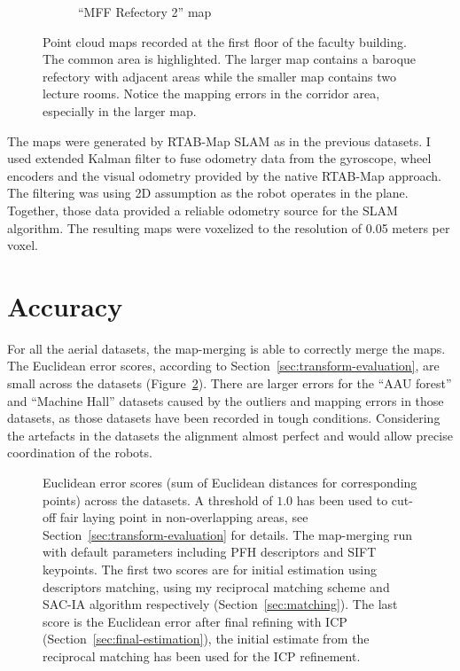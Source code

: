 \begin{figure}
\begin{subfigure}[b]{\textwidth}
        \caption{``MFF Refectory 2'' map}
    \end{subfigure}
    \caption[MFF Refectory maps]{Point cloud maps recorded at the first floor of the faculty building. The common area is highlighted. The larger map contains a baroque refectory with adjacent areas while the smaller map contains two lecture rooms. Notice the mapping errors in the corridor area, especially in the larger map.}
    \label{fig:mff_refectory}
\end{figure}


The maps were generated by RTAB-Map \gls{SLAM} as in the previous datasets. I used extended Kalman filter to fuse odometry data from the gyroscope, wheel encoders and the visual odometry provided by the native RTAB-Map approach. The filtering was using \gls{2D} assumption as the robot operates in the plane. Together, those data provided a reliable odometry source for the \gls{SLAM} algorithm. The resulting maps were voxelized to the resolution of 0.05 meters per voxel.

\section{Accuracy}

For all the aerial datasets, the map-merging is able to correctly merge the maps. The Euclidean error scores, according to Section~\ref{sec:transform-evaluation}, are small across the datasets (Figure~\ref{fig:plot:euc_dist}). There are larger errors for the ``AAU forest'' and ``Machine Hall'' datasets caused by the outliers and mapping errors in those datasets, as those datasets have been recorded in tough conditions. Considering the artefacts in the datasets the alignment almost perfect and would allow precise coordination of the robots.

\begin{figure}
  \centering
  
  \caption[Euclidean error scores for aerial datasets]{Euclidean error scores (sum of Euclidean distances for corresponding points) across the datasets. A threshold of $1.0$ has been used to cut-off fair laying point in non-overlapping areas, see Section~\ref{sec:transform-evaluation} for details. The map-merging run with default parameters including \gls{PFH} descriptors and \gls{SIFT} keypoints. The first two scores are for initial estimation using descriptors matching, using my reciprocal matching scheme and \gls{SAC-IA} algorithm respectively (Section~\ref{sec:matching}). The last score is the Euclidean error after final refining with \gls{ICP} (Section~\ref{sec:final-estimation}), the initial estimate from the reciprocal matching has been used for the \gls{ICP} refinement.}
  \label{fig:plot:euc_dist}
\end{figure}

